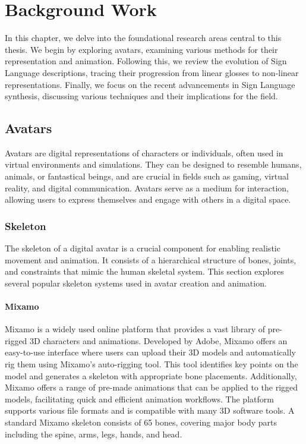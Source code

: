 \documentclass[../../main.tex]{subfiles}
\begin{document}
\chapter{Background Work}

In this chapter, we delve into the foundational research areas central to this thesis. We begin by exploring avatars, examining various methods for their representation and animation. Following this, we review the evolution of Sign Language descriptions, tracing their progression from linear glosses to non-linear representations. Finally, we focus on the recent advancements in Sign Language synthesis, discussing various techniques and their implications for the field.

\section{Avatars}

Avatars are digital representations of characters or individuals, often used in virtual environments and simulations. They can be designed to resemble humans, animals, or fantastical beings, and are crucial in fields such as gaming, virtual reality, and digital communication. Avatars serve as a medium for interaction, allowing users to express themselves and engage with others in a digital space. 

\subsection{Skeleton}

The skeleton of a digital avatar is a crucial component for enabling realistic movement and animation. It consists of a hierarchical structure of bones, joints, and constraints that mimic the human skeletal system. This section explores several popular skeleton systems used in avatar creation and animation.

\subsubsection{Mixamo}

Mixamo is a widely used online platform that provides a vast library of pre-rigged 3D characters and animations. Developed by Adobe, Mixamo offers an easy-to-use interface where users can upload their 3D models and automatically rig them using Mixamo's auto-rigging tool. This tool identifies key points on the model and generates a skeleton with appropriate bone placements. Additionally, Mixamo offers a range of pre-made animations that can be applied to the rigged models, facilitating quick and efficient animation workflows. The platform supports various file formats and is compatible with many 3D software tools. A standard Mixamo skeleton consists of 65 bones, covering major body parts including the spine, arms, legs, hands, and head.
\end{document}
